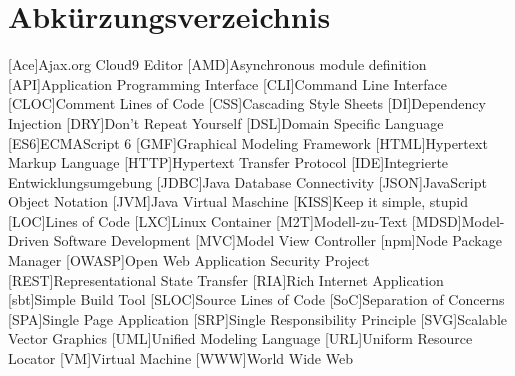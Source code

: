 \chapter*{Abkürzungsverzeichnis}
\label{chap:ACRONYM}

\begin{acronym}[Bash]
  [Ace]{Ajax.org Cloud9 Editor}
  [AMD]{Asynchronous module definition}
  [API]{Application Programming Interface}
  [CLI]{Command Line Interface}
  [CLOC]{Comment Lines of Code}
  [CSS]{Cascading Style Sheets}
  [DI]{Dependency Injection}
  [DRY]{Don't Repeat Yourself}
  [DSL]{Domain Specific Language}
  [ES6]{ECMAScript 6}
  [GMF]{Graphical Modeling Framework}
  [HTML]{Hypertext Markup Language}
  [HTTP]{Hypertext Transfer Protocol}
  [IDE]{Integrierte Entwicklungsumgebung}
  [JDBC]{Java Database Connectivity}
  [JSON]{JavaScript Object Notation}
  [JVM]{Java Virtual Maschine}
  [KISS]{Keep it simple, stupid}
  [LOC]{Lines of Code}
  [LXC]{Linux Container}
  [M2T]{Modell-zu-Text}
  [MDSD]{Model-Driven Software Development}
  [MVC]{Model View Controller}
  [npm]{Node Package Manager}
  [OWASP]{Open Web Application Security Project}
  [REST]{Representational State Transfer}
  [RIA]{Rich Internet Application}
  [sbt]{Simple Build Tool}
  [SLOC]{Source Lines of Code}
  [SoC]{Separation of Concerns}
  [SPA]{Single Page Application}
  [SRP]{Single Responsibility Principle}
  [SVG]{Scalable Vector Graphics}
  [UML]{Unified Modeling Language}
  [URL]{Uniform Resource Locator}
  [VM]{Virtual Machine}
  [WWW]{World Wide Web}

\end{acronym}

\newpage
